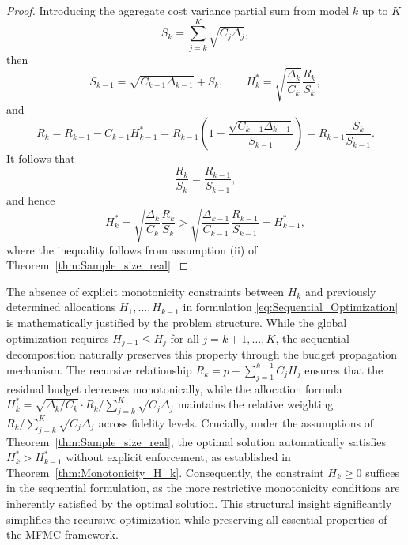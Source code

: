 \begin{proof}
Introducing the aggregate cost variance partial sum from model $k$ up to $K$
%
\begin{equation}\label{eq:aggregate_cost_variance_weight_Sk}
    S_k=\sum_{j=k}^K\sqrt{C_j\Delta_j},
\end{equation}
%
then 
\begin{equation}\label{eq:S_k_H_k}
    S_{k-1}=\sqrt{C_{k-1}\Delta_{k-1}}+S_k, \qquad H_k^* = \sqrt{\frac{\Delta_k}{C_k}}\frac{R_k}{S_k},
\end{equation}
%
and
\begin{equation*}
R_k = R_{k-1} - C_{k-1}H_{k-1}^* = R_{k-1}\left(1 - \frac{\sqrt{C_{k-1}\Delta_{k-1}}}{S_{k-1}}\right) = R_{k-1}\frac{S_k}{S_{k-1}}.
\end{equation*}
It follows that 
%
\begin{equation}\label{eq:R_kS_k}
    \frac{R_k}{S_k} = \frac{R_{k-1}}{S_{k-1}},
\end{equation}
%
and hence
\[
H_k^*=\sqrt{\frac{\Delta_k}{C_k}}\frac{R_k}{S_k}
> \sqrt{\frac{\Delta_{k-1}}{C_{k-1}}}\frac{R_{k-1}}{S_{k-1}}
=H_{k-1}^*,
\]
where the inequality follows from assumption (ii) of Theorem~\ref{thm:Sample_size_real}.
\end{proof}
%



The absence of explicit monotonicity constraints between $H_k$ and previously determined allocations $H_1, \ldots, H_{k-1}$ in formulation \eqref{eq:Sequential_Optimization} is mathematically justified by the problem structure. While the global optimization requires $H_{j-1} \le H_j$ for all $j=k+1,\ldots,K$, the sequential decomposition naturally preserves this property through the budget propagation mechanism. The recursive relationship $R_k = p - \sum_{j=1}^{k-1} C_j H_j$ ensures that the residual budget decreases monotonically, while the allocation formula $H_k^* = \sqrt{\Delta_k/C_k} \cdot R_k / \sum_{j=k}^K \sqrt{C_j\Delta_j}$ maintains the relative weighting $R_k / \sum_{j=k}^K \sqrt{C_j\Delta_j}$ across fidelity levels. Crucially, under the assumptions of Theorem~\ref{thm:Sample_size_real}, the optimal solution automatically satisfies $H_k^* > H_{k-1}^*$ without explicit enforcement, as established in Theorem~\ref{thm:Monotonicity_H_k}. Consequently, the constraint $H_k \ge 0$ suffices in the sequential formulation, as the more restrictive monotonicity conditions are inherently satisfied by the optimal solution. This structural insight significantly simplifies the recursive optimization while preserving all essential properties of the MFMC framework.

